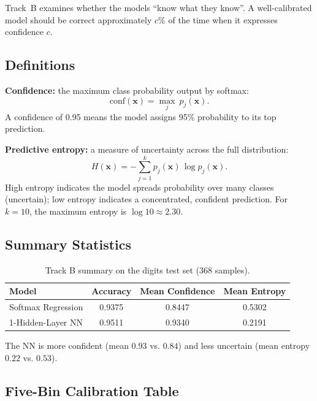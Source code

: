 \documentclass[11pt]{article}
\newcommand{\vx}{\mathbf{x}}
\begin{document}
Track~B examines whether the models ``know what they know''.
A well-calibrated model should be correct approximately $c\%$ of the time when it
expresses confidence $c$.

\subsection{Definitions}

\textbf{Confidence:} the maximum class probability output by softmax:
\begin{equation}
    \text{conf}(\vx) = \max_j\ p_j(\vx).
\end{equation}
A confidence of 0.95 means the model assigns 95\% probability to its top prediction.

\textbf{Predictive entropy:} a measure of uncertainty across the full distribution:
\begin{equation}
    H(\vx) = -\sum_{j=1}^k p_j(\vx)\,\log p_j(\vx).
\end{equation}
High entropy indicates the model spreads probability over many classes
(uncertain); low entropy indicates a concentrated, confident prediction.
For $k=10$, the maximum entropy is $\log 10 \approx 2.30$.

\subsection{Summary Statistics}

\begin{table}[h]
    \centering
    \caption{Track B summary on the digits test set (368 samples).}
    \label{tab:trackb-summary}
    \begin{tabular}{lccc}
        \toprule
        \textbf{Model} & \textbf{Accuracy} & \textbf{Mean Confidence} & \textbf{Mean Entropy} \\
        \midrule
        Softmax Regression & 0.9375 & 0.8447 & 0.5302 \\
        1-Hidden-Layer NN  & 0.9511 & 0.9340 & 0.2191 \\
        \bottomrule
    \end{tabular}
\end{table}

The NN is more confident (mean $0.93$ vs. $0.84$) and less uncertain (mean entropy
$0.22$ vs. $0.53$).

\subsection{Five-Bin Calibration Table}
\end{document}
